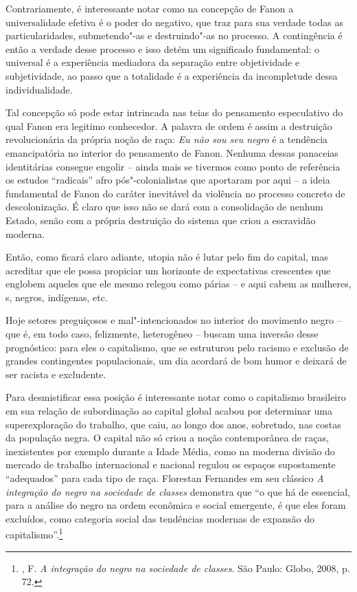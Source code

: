 Contrariamente, é interessante notar como na concepção de Fanon a
universalidade efetiva é o poder do negativo, que traz para sua verdade
todas as particularidades, submetendo"-as e destruindo"-as no processo. A
contingência é então a verdade desse processo e isso detém um
significado fundamental: o universal é a experiência mediadora da
separação entre objetividade e subjetividade, ao passo que a totalidade
é a experiência da incompletude dessa individualidade.

Tal concepção só pode estar intrincada nas teias do pensamento
especulativo do qual Fanon era legitimo conhecedor. A palavra de ordem é
assim a destruição revolucionária da própria noção de raça: \emph{Eu não
sou seu negro} é a tendência emancipatória no interior do pensamento de
Fanon. Nenhuma dessas panaceias identitárias consegue engolir -- ainda
mais se tivermos como ponto de referência os estudos ``radicais'' afro
pós"-colonialistas que aportaram por aqui -- a ideia fundamental de Fanon
do caráter inevitável da violência no processo concreto de
descolonização. É claro que isso não se dará com a consolidação de
nenhum Estado, senão com a própria destruição do sistema que criou a
escravidão moderna.

Então, como ficará claro adiante, utopia não é lutar pelo fim do
capital, mas acreditar que ele possa propiciar um horizonte de
expectativas crescentes que englobem aqueles que ele mesmo relegou como
párias -- e aqui cabem as mulheres, s, negros, indígenas, etc.

Hoje setores preguiçosos e mal"-intencionados no interior do movimento
negro -- que é, em todo caso, felizmente, heterogêneo -- buscam uma
inversão desse prognóstico: para eles o capitalismo, que se estruturou
pelo racismo e exclusão de grandes contingentes populacionais, um dia
acordará de bom humor e deixará de ser racista e excludente.

Para desmistificar essa posição é interessante notar como o capitalismo
brasileiro em sua relação de subordinação ao capital global acabou por
determinar uma superexploração do trabalho, que caiu, ao longo dos anos,
sobretudo, nas costas da população negra. O capital não só criou a noção
contemporânea de raças, inexistentes por exemplo durante a Idade Média,
como na moderna divisão do mercado de trabalho internacional e nacional
regulou os espaços supostamente ``adequados'' para cada tipo de raça.
Florestan Fernandes em seu clássico \emph{A integração do negro na
sociedade de classes} demonstra que ``o que há de essencial, para a
análise do negro na ordem econômica e social emergente, é que eles foram
excluídos, como categoria social das tendências modernas de expansão do
capitalismo''.\footnote{, F. \emph{A integração do negro na
  sociedade de classes}. São Paulo: Globo, 2008, p. 72.}


